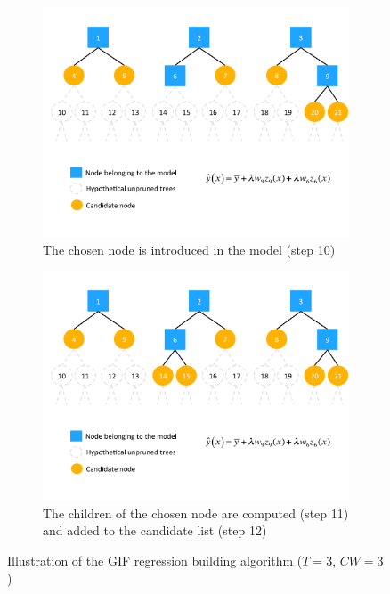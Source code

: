 \documentclass{article}
\begin{document}
\begin{figure}[ht]
    \vspace{4ex}
  \begin{subfigure}[b]{0.5\linewidth}
    \centering
    \includegraphics[height=0.25\textheight]{gif_algo5} 
    \caption{The chosen node is introduced in the model (step 10)} 
    \label{fig:gif-algo5} 
  \end{subfigure}
  \hspace{\fill}
  \begin{subfigure}[b]{0.5\linewidth}
    \centering
    \includegraphics[height=0.25\textheight]{gif_algo6} 
    \caption{The children of the chosen node are computed (step 11) and added 
    to the candidate list (step 12)} 
    \label{fig:gif-algo6} 
  \end{subfigure} 

\caption{Illustration of the GIF regression building algorithm ($T=3$, $CW=3$)}
\label{fig:gif-algo} 
\end{figure}
\end{document}
